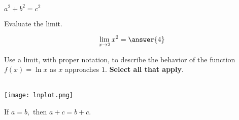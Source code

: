 \documentclass[handout]{ximera}
\begin{document}
\begin{theorem}
    $a^2+b^2 = c^2$
\end{theorem}    


\begin{exercise}
Evaluate the limit.

\[ \lim\limits_{x \to 2} x^2 = \answer{4} \]

\end{exercise}


\begin{question} Use a limit, with proper notation, to describe the behavior of the function $f(x)=\ln x$ as $x$ approaches $1.$  \textbf{Select all that apply}. \\ \\

    \begin{center} 
        \texttt{[image: lnplot.png]}
    \end{center}

\begin{selectAll}
    \end{selectAll}
    \end{question}

\begin{theorem} 

If $ a = b,$ then $a + c = b + c$.
\end{theorem}
\end{document}
